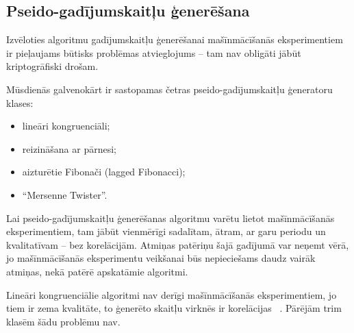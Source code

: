\documentclass{ludis}
\begin{document}
\subsection{Pseido-gadījumskaitļu ģenerēšana}
Izvēloties algoritmu gadījumskaitļu ģenerēšanai mašīnmācīšanās eksperimentiem ir pieļaujams būtisks problēmas atvieglojums -- tam nav obligāti jābūt kriptogrāfiski drošam.

Mūsdienās galvenokārt ir sastopamas četras pseido-gadījumskaitļu ģeneratoru klases:
\begin{itemize}
\item lineāri kongruenciāli;
\item reizināšana ar pārnesi;
\item aizturētie Fibonači (lagged Fibonacci);
\item ``Mersenne Twister''.
\end{itemize}

Lai pseido-gadījumskaitļu ģenerēšanas algoritmu varētu lietot mašīnmācīšanās eksperimentiem, tam jābūt vienmērīgi sadalītam, ātram, ar garu periodu un kvalitatīvam -- bez korelācijām. Atmiņas patēriņu šajā gadījumā var neņemt vērā, jo mašīnmācīšanās eksperimentu veikšanai būs nepieciešams daudz vairāk atmiņas, nekā patērē apskatāmie algoritmi.

Lineāri kongruenciālie algoritmi nav derīgi mašīnmācīšanās eksperimentiem, jo tiem ir zema kvalitāte, to ģenerēto skaitļu virknēs ir korelācijas ~\cite{rng_miller_park}. Pārējām trim klasēm šādu problēmu nav.
\end{document}
